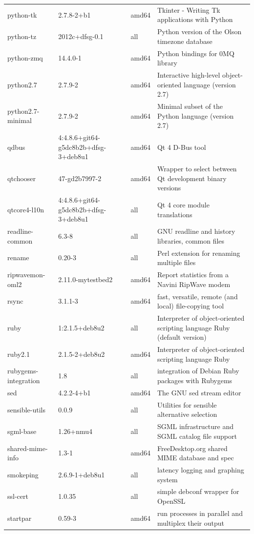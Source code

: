 \documentclass[a4paper,10pt]{article}
\begin{document}
\begin{appendices}
{\begin{longtable}{p{3.25cm}@{\hspace{0.25cm}}p{4cm}@{\hspace{0.25cm}}l@{\hspace{0.25cm}}p{7cm}}
python-tk	&	2.7.8-2+b1	&	amd64	&	Tkinter - Writing Tk applications with Python	\\
python-tz	&	2012c+dfsg-0.1	&	all	&	Python version of the Olson timezone database	\\
python-zmq	&	14.4.0-1	&	amd64	&	Python bindings for 0MQ library	\\
python2.7	&	2.7.9-2	&	amd64	&	Interactive high-level object-oriented language (version 2.7)	\\
python2.7-minimal	&	2.7.9-2	&	amd64	&	Minimal subset of the Python language (version 2.7)	\\
qdbus	&	4:4.8.6+git64-g5dc8b2b+dfsg-3+deb8u1	&	amd64	&	Qt 4 D-Bus tool	\\
qtchooser	&	47-gd2b7997-2	&	amd64	&	Wrapper to select between Qt development binary versions	\\
qtcore4-l10n	&	4:4.8.6+git64-g5dc8b2b+dfsg-3+deb8u1	&	all	&	Qt 4 core module translations	\\
readline-common	&	6.3-8	&	all	&	GNU readline and history libraries, common files	\\
rename	&	0.20-3	&	all	&	Perl extension for renaming multiple files	\\
ripwavemon-oml2	&	2.11.0-mytestbed2	&	amd64	&	Report statistics from a Navini RipWave modem	\\
rsync	&	3.1.1-3	&	amd64	&	fast, versatile, remote (and local) file-copying tool	\\
ruby	&	1:2.1.5+deb8u2	&	all	&	Interpreter of object-oriented scripting language Ruby (default version)	\\
ruby2.1	&	2.1.5-2+deb8u2	&	amd64	&	Interpreter of object-oriented scripting language Ruby	\\
rubygems-integration	&	1.8	&	all	&	integration of Debian Ruby packages with Rubygems	\\
sed	&	4.2.2-4+b1	&	amd64	&	The GNU sed stream editor	\\
sensible-utils	&	0.0.9	&	all	&	Utilities for sensible alternative selection	\\
sgml-base	&	1.26+nmu4	&	all	&	SGML infrastructure and SGML catalog file support	\\
shared-mime-info	&	1.3-1	&	amd64	&	FreeDesktop.org shared MIME database and spec	\\
smokeping	&	2.6.9-1+deb8u1	&	all	&	latency logging and graphing system	\\
ssl-cert	&	1.0.35	&	all	&	simple debconf wrapper for OpenSSL	\\
startpar	&	0.59-3	&	amd64	&	run processes in parallel and multiplex their output	\\

\end{longtable}}
\end{appendices}
\end{document}
